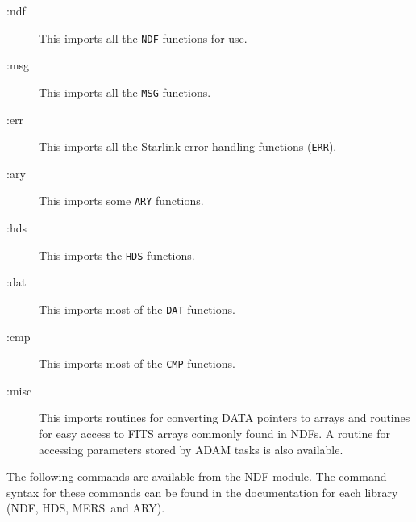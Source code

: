 \documentclass[twoside,11pt]{article}
\newcommand{\ndf}{\xref{NDF}{sun33}{}}
\newcommand{\hds}{\xref{HDS}{sun92}{}}
\newcommand{\ary}{\xref{ARY}{sun11}{}}
\newcommand{\mers}{\xref{MERS}{sun104}{}}
\newcommand{\xref}[3]{#1}
\renewcommand{\_}{\texttt{\symbol{95}}}
\begin{document}
\begin{description}

\item[:ndf] \mbox{}

This imports all the \texttt{NDF\_} functions for use.

\item[:msg] \mbox{}

This imports all the \texttt{MSG\_} functions.

\item[:err] \mbox{}

This imports all the Starlink error handling functions (\texttt{ERR\_}).

\item[:ary] \mbox{}

This imports some \texttt{ARY\_} functions.

\item[:hds] \mbox{}

This imports the \texttt{HDS\_} functions.

\item[:dat] \mbox{}

This imports most of the \texttt{DAT\_} functions.

\item[:cmp] \mbox{}

This imports most of the \texttt{CMP\_} functions.

\item[:misc] \mbox{}

This imports routines for converting DATA pointers to arrays and routines for 
easy access to FITS arrays commonly found in NDFs. A routine for accessing
parameters stored by ADAM tasks is also available.

\end{description}

The following commands are available from the NDF module.
The command syntax for these commands can be found in the documentation
for each library (\ndf, \hds, \mers\ and \ary).
\end{document}
